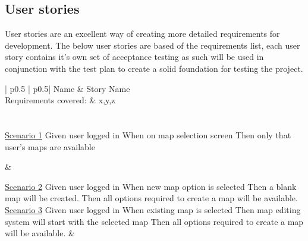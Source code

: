 \subsection{User stories}
User stories are an excellent way of creating more detailed requirements for development. The below user stories are based of the requirements list, each user story contains it's own set of acceptance testing as such will be used in conjunction with the test plan to create a solid foundation for testing the project.\\

\begin{longtable}{| p{} | p{}|}
	\hline
	Name & Story Name\\\hline
	Requirements covered: & x,y,z\\\hline
	\\\hline
	\\\hline
	\underline{Scenario 1}\newline
	Given user logged in \newline
	When on map selection screen \newline 
	Then only that user's maps are available\newline
	
	&
	
	\underline{Scenario 2}\newline
	Given user logged in \newline
	When new map option is selected \newline 
	Then a blank map will be created.\newline
	Then all options required to create a map will be available.\newline
	\\\hline
	\underline{Scenario 3}\newline
	Given user logged in \newline
	When existing map is selected \newline 
	Then map editing system will start with the selected map\newline
	Then all options required to create a map will be available.\newline
	&
	\\\hline
\end{longtable}


